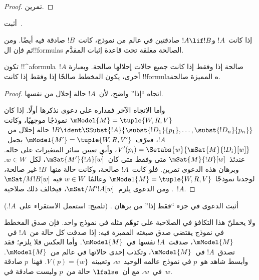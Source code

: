 \documentclass[../../../include/open-logic-section]{subfiles}
\begin{document}
\begin{proof}
  تمرين.
\end{proof}

\begin{prob}
  أثبت~.
\end{prob}

\begin{prop}
  إذا كانت~$!A$ و$!A \lif !B$ صادقتين في عالم من نموذج، كانت~$!B$
  صادقة فيه أيضًا. ومن ثم فإن ال!!{formula}s الصالحة مغلقة تحت قاعدة
  إثبات المقدَّم.
\end{prop}

\begin{prop}
  تكون !!^a{formula}~$!A$ صالحة إذا وفقط إذا كانت جميع حالات إحلالها
  صالحة. وبعبارة أخرى، يكون المخطط صالحًا إذا وفقط إذا كانت
  !!{formula}ه المميزة صالحة.
\end{prop}

\begin{proof}
  اتجاه ``إذا'' واضح، لأن~$!A$ حالة إحلال من نفسها.

  وأما الاتجاه الآخر فمداره على دعوى نذكرها أولًا. إذا كان
  $\mModel{M} = \tuple{W, R, V}$ نموذجًا موجهيًا، وكانت
  $!B \ident \SSubst{!A}{\subst{!D_1}{p_1},\dots,\subst{!D_n}{p_n}}$
  حالة إحلال من~$!A$، فعرّف~$\mModel{M'} = \tuple{W, R, V'}$
  بجعل~$V'(p_i) = \Setabs{w}{\mSat{M}{!D_i}[w]}$، وأبقِ تعيين
  سائر المتغيرات على حاله. عندئذ~$\mSat{M}{!B}[w]$ متى وفقط متى
  كان~$\mSat{M'}{!A}[w]$، لكل~$w \in W$. وبرهان هذه الدعوى تمرين.
  فلو كانت~$!A$ صالحة، وكانت حالة منها~$!B$ غير صالحة، لوجدنا
  نموذجًا~$\mModel{M} = \tuple{W, R, V}$ وعالمًا~$w \in W$ فيه
  $\mSat/{M}{!B}[w]$. ومن الدعوى يلزم~$\mSat/{M'}{!A}[w]$،
  فيخالف ذلك صلاحية~$!A$.
\end{proof}

\begin{prob}
  أثبت الدعوى في جزء ``فقط إذا'' من برهان
  . (تلميح: استعمل
  الاستقراء على~$!A$.)
\end{prob}

ولا يحملنّ هذا التكافؤ في الصلاحية على توهّم مثله في نموذج واحد.
فإن صدق المخطط في نموذج يقتضي صدق صيغته المميزة فيه: إذا صدقت كل
حالة من~$!A$ في~$\mModel{M}$، صدقت~$!A$ نفسها في~$\mModel{M}$.
وأما العكس فلا يلزم؛ فقد تصدق~$!A$ في~$\mModel{M}$، وتكذب
إحدى حالاتها في عالم من~$\mModel{M}$. وأبسط شاهد هو~$p$ في نموذج
عالمه الوحيد~$w$، وتعيينه~$V(p) = \{w\}$. فهنا~$p$ صادقة
في~$w$، مع أن~$\lfalse$ حالة من~$p$ وليست صادقة في~$w$.
\end{document}

